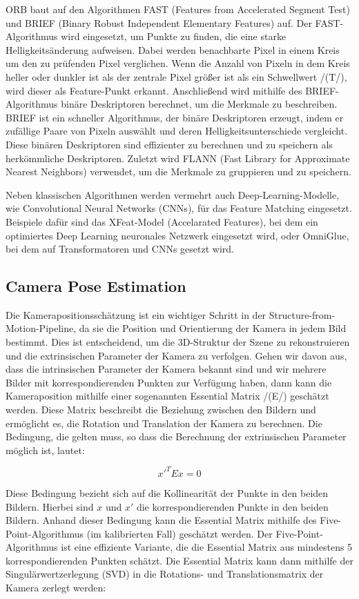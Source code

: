 ORB baut auf den Algorithmen FAST (Features from Accelerated Segment Test) und BRIEF (Binary Robust Independent Elementary Features) auf. Der FAST-Algorithmus wird eingesetzt, um Punkte zu finden, die eine starke Helligkeitsänderung aufweisen. Dabei werden benachbarte Pixel in einem Kreis um den zu prüfenden Pixel verglichen. Wenn die Anzahl von Pixeln in dem Kreis heller oder dunkler ist als der zentrale Pixel größer ist als ein Schwellwert /(T/), wird dieser als Feature-Punkt erkannt. Anschließend wird mithilfe des BRIEF-Algorithmus binäre Deskriptoren berechnet, um die Merkmale zu beschreiben. BRIEF ist ein schneller Algorithmus, der binäre Deskriptoren erzeugt, indem er zufällige Paare von Pixeln auswählt und deren Helligkeitsunterschiede vergleicht. Diese binären Deskriptoren sind effizienter zu berechnen und zu speichern als herkömmliche Deskriptoren. Zuletzt wird FLANN (Fast Library for Approximate Nearest Neighbors) verwendet, um die Merkmale zu gruppieren und zu speichern.

Neben klassischen Algorithmen werden vermehrt auch Deep-Learning-Modelle, wie Convolutional Neural Networks (CNNs), für das Feature Matching eingesetzt. Beispiele dafür sind das XFeat-Model (Accelarated Features), bei dem ein optimiertes Deep Learning neuronales Netzwerk eingesetzt wird, oder OmniGlue, bei dem auf Transformatoren und CNNs gesetzt wird.

\subsection{Camera Pose Estimation}

Die Kamerapositionsschätzung ist ein wichtiger Schritt in der Structure-from-Motion-Pipeline, da sie die Position und Orientierung der Kamera in jedem Bild bestimmt. Dies ist entscheidend, um die 3D-Struktur der Szene zu rekonstruieren und die extrinsischen Parameter der Kamera zu verfolgen. Gehen wir davon aus, dass die intrinsischen Parameter der Kamera bekannt sind und wir mehrere Bilder mit korrespondierenden Punkten zur Verfügung haben, dann kann die Kameraposition mithilfe einer sogenannten Essential Matrix /(E/) geschätzt werden. Diese Matrix beschreibt die Beziehung zwischen den Bildern und ermöglicht es, die Rotation und Translation der Kamera zu berechnen. Die Bedingung, die gelten muss, so dass die Berechnung der extrinsischen Parameter möglich ist, lautet:

\[ x'^T E x = 0 \]

Diese Bedingung bezieht sich auf die Kollinearität der Punkte in den beiden Bildern. Hierbei sind \( x \) und \( x' \) die korrespondierenden Punkte in den beiden Bildern. Anhand dieser Bedingung kann die Essential Matrix mithilfe des Five-Point-Algorithmus (im kalibrierten Fall) geschätzt werden. Der Five-Point-Algorithmus ist eine effiziente Variante, die die Essential Matrix aus mindestens 5 korrespondierenden Punkten schätzt. Die Essential Matrix kann dann mithilfe der Singulärwertzerlegung (SVD) in die Rotations- und Translationsmatrix der Kamera zerlegt werden:

